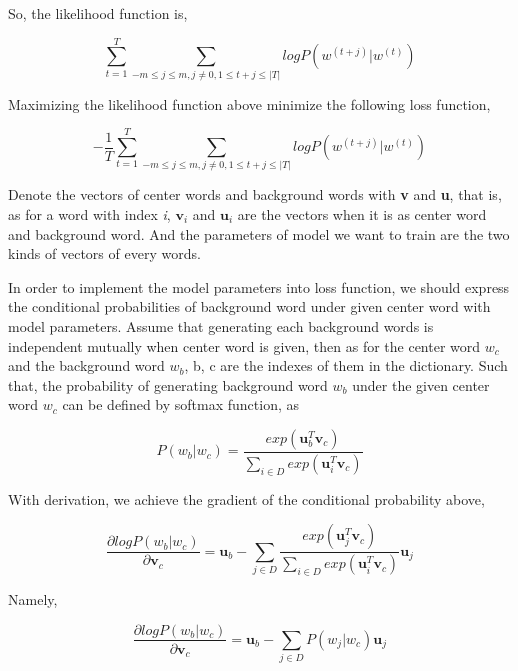\documentclass[10pt, conference, compsocconf]{IEEEtran}
\begin{document}
So, the likelihood function is,

\begin{equation}
\sum_{t=1}^{T}\sum_{-m \leq j \leq m, j\neq 0, 1\leq t+j \leq \big|T\big|}log P(w^{(t+j)}\big|w^{(t)})
\end{equation}

Maximizing the likelihood function above minimize the following loss function,

\begin{equation}
-\frac{1}{T} \sum_{t=1}^{T}\sum_{-m \leq j \leq m, j\neq 0, 1\leq t+j \leq \big|T\big|}log P(w^{(t+j)}\big|w^{(t)})
\end{equation}

Denote the vectors of center words and background words with \textbf{v} and \textbf{u}, that is, as for a word with index \textit{i}, $\textbf{v}_{i}$ and $\textbf{u}_{i}$ are the vectors when it is as center word and background word. And the parameters of model we want to train are the two kinds of vectors of every words.

In order to implement the model parameters into loss function, we should express the conditional probabilities of background word under given center word with model parameters. Assume that generating each background words is independent mutually when center word is given, then as for the center word $w_{c}$ and the background word $w_{b}$, b, c are the indexes of them in the dictionary. Such that, the probability of generating background word $w_{b}$ under the given center word $w_{c}$ can be defined by softmax function, as

\begin{equation}
P(w_{b}\big|w_{c})=\frac{exp(\textbf{u}_{b} ^{T}\textbf{v}_{c})}{\sum_{i\in D}exp(\textbf{u}_{i}^{T}\textbf{v}_{c})}
\end{equation}

With derivation, we achieve the gradient of the conditional probability above,

\begin{equation}
\frac{\partial logP(w_{b}\big|w_{c})}{\partial \textbf{v}_{c}}=\textbf{u}_{b}-\sum_{j\in D}\frac{exp(\textbf{u}_{j} ^{T}\textbf{v}_{c})}{\sum_{i\in D}exp(\textbf{u}_{i}^{T}\textbf{v}_{c})}\textbf{u}_{j}
\end{equation}

Namely,

\begin{equation}
\frac{\partial logP(w_{b}\big|w_{c})}{\partial \textbf{v}_{c}}=\textbf{u}_{b}-\sum_{j\in D}P(w_{j}\big|w_{c})\textbf{u}_{j}
\end{equation}
\end{document}
